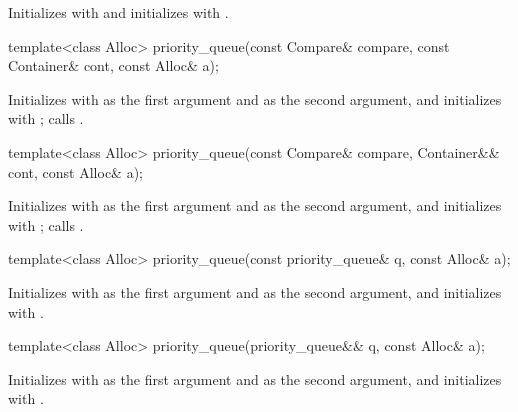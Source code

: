\begin{itemdescr}
\pnum
\effects
Initializes  with  and initializes  with .
\end{itemdescr}

%
\begin{itemdecl}
template<class Alloc>
  priority_queue(const Compare& compare, const Container& cont, const Alloc& a);
\end{itemdecl}

\begin{itemdescr}
\pnum
\effects
Initializes  with  as the first argument and  as the second
argument, and initializes  with ;
calls .
\end{itemdescr}

%
\begin{itemdecl}
template<class Alloc>
  priority_queue(const Compare& compare, Container&& cont, const Alloc& a);
\end{itemdecl}

\begin{itemdescr}
\pnum
\effects
Initializes  with  as the first argument and 
as the second argument, and initializes  with ;
calls .
\end{itemdescr}

%
\begin{itemdecl}
template<class Alloc> priority_queue(const priority_queue& q, const Alloc& a);
\end{itemdecl}

\begin{itemdescr}
\pnum
\effects
Initializes  with  as the first argument and  as
the second argument, and initializes  with .
\end{itemdescr}

%
\begin{itemdecl}
template<class Alloc> priority_queue(priority_queue&& q, const Alloc& a);
\end{itemdecl}

\begin{itemdescr}
\pnum
\effects
Initializes  with  as the first argument and 
as the second argument, and initializes  with .
\end{itemdescr}

